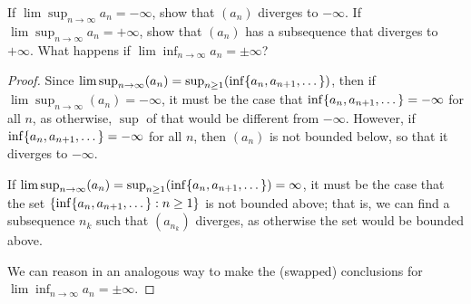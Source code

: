 \begin{exercise}{25}
If $\lim\sup_{n\to\infty}a_n=-\infty$, show that $(a_n)$ diverges to $-\infty$. If $\lim\sup_{n\to\infty}a_n=+\infty$, show that $(a_n)$ has a subsequence that diverges to $+\infty$. What happens if $\lim\inf_{n\to\infty}a_n=\pm\infty$?
\end{exercise}
\begin{proof}
Since $\lim\sup_{n\to\infty}(a_n) = \sup_{n\geq 1}(\inf\{a_n,a_{n+1},\dots\})$, then if\\ $\lim\sup_{n\to\infty}(a_n)=-\infty$, it must be the case that $\inf\{a_n,a_{n+1},\dots\}=-\infty$ for all $n$, as otherwise, $\sup$ of that would be different from $-\infty$. However, if $\inf\{a_n,a_{n+1},\dots\}=-\infty$ for all $n$, then $(a_n)$ is not bounded below, so that it diverges to $-\infty$.

If $\lim\sup_{n\to\infty}(a_n)= \sup_{n\geq 1}(\inf\{a_n,a_{n+1},\dots\})= \infty$, it must be the case that the set $\{\inf\{a_n,a_{n+1},\dots\}:n\geq 1\}$ is not bounded above; that is, we can find a subsequence $n_k$ such that $(a_{n_k})$ diverges, as otherwise the set would be bounded above. 

We can reason in an analogous way to make the (swapped) conclusions for $\lim\inf_{n\to\infty}a_n=\pm\infty$.
\end{proof}

